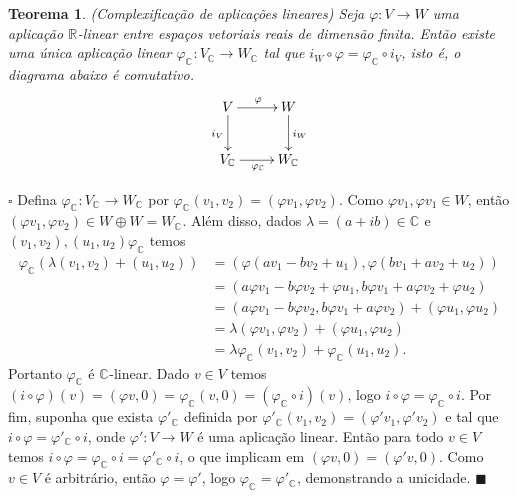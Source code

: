 \documentclass[12pt]{book}
\newtheorem{teorema}{Teorema}[section]
\newenvironment{prova}[1]{$\square$ #1}{\hfill$\blacksquare$}
\newcommand{\complexificacao}[1]{#1_{\complexo{}}}
\newcommand{\complexo}[1]{\mathbb{C}^{#1}}
\newcommand{\real}[1]{\mathbb{R}^{#1}}
\newcommand{\reta}{\real{}}
\begin{document}
	\begin{teorema}
		(Complexificação de aplicações lineares) Seja $\varphi : V \to W$ uma aplicação
		$\reta$-linear entre espaços vetoriais reais de dimensão finita. Então existe uma única aplicação linear $\complexificacao{\varphi}:\complexificacao{V} \to \complexificacao{W}$ tal que $i_{W}\circ \varphi = \complexificacao{\varphi} \circ i_{V}$, isto é, o diagrama abaixo é comutativo.
		$$
		\xymatrix{
			V\ar[d]_{i_{V}}\ar[r]^{\varphi} & W\ar[d]^{i_{W}} 
			\\
			\complexificacao{V} \ar[r]_{\complexificacao{\varphi}}&\complexificacao{W} 
		}
		$$
	\end{teorema}
	\begin{prova}
		Defina $\complexificacao{\varphi}:\complexificacao{V} \to \complexificacao{W}$ por $\complexificacao{\varphi}(v_{1}, v_{2}) = (\varphi v_{1}, \varphi v_{2})$. Como $\varphi v_{1}, \varphi v_{1} \in W$, então $(\varphi v_{1}, \varphi v_{2}) \in W\oplus W = \complexificacao{W}$. Além disso, dados $\lambda = (a+ib)\in \complexo{}$ e $(v_{1}, v_{2}), (u_{1}, u_{2})\complexificacao{\varphi}$ temos 
		$$
		\begin{aligned}
		\complexificacao{\varphi} (\lambda(v_{1}, v_{2}) + (u_{1}, u_{2})) 
		&= (\varphi(a v_{1} - bv_{2} + u_{1}), \varphi(b v_{1}+a v_{2} + u_{2}))
		\\
		&=(a\varphi v_{1} - b\varphi v_{2} + \varphi u_{1}, b\varphi v_{1}+a\varphi v_{2} + \varphi u_{2})
		\\
		&=(a\varphi v_{1} - b\varphi v_{2} , b\varphi v_{1}+a\varphi v_{2} )+(\varphi u_{1},\varphi u_{2})
		\\
		&=\lambda(\varphi v_{1},\varphi v_{2})+(\varphi u_{1},\varphi u_{2})
		\\
		&=\lambda 	\complexificacao{\varphi} (v_{1},v_{2})+\complexificacao{\varphi} (u_{1},u_{2}).
		\end{aligned}
		$$
		Portanto $\complexificacao{\varphi}$ é $\complexo{}$-linear. Dado $v \in V$ temos $(i\circ \varphi)(v) = (\varphi v,0) = \complexificacao{\varphi}(v,0) = (\complexificacao{\varphi} \circ i)(v)$, logo $i\circ \varphi =\complexificacao{\varphi} \circ i$. Por fim, suponha que exista $\complexificacao{\varphi'} $ definida por $\complexificacao{\varphi'}(v_{1}, v_{2}) = (\varphi' v_{1}, \varphi' v_{2})$ e tal que $i\circ \varphi =\complexificacao{\varphi'} \circ i$, onde $\varphi':V\to W$ é uma aplicação linear. Então para todo $v \in V$ temos $i\circ \varphi =\complexificacao{\varphi} \circ i = \complexificacao{\varphi'} \circ i$, o que implicam em $(\varphi v, 0) = (\varphi' v, 0)$. Como $v \in V$ é arbitrário, então $\varphi = \varphi'$, logo $\complexificacao{\varphi} = \complexificacao{\varphi'}$, demonstrando a unicidade. 
	\end{prova}
	
\end{document}
